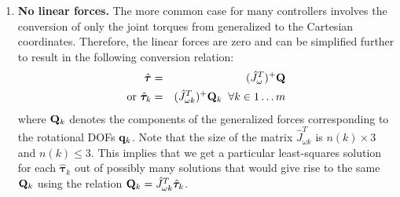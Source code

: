 \begin{enumerate}
\item \textbf{No linear forces. } The more common case for many controllers involves the conversion of only the joint torques from generalized to the Cartesian coordinates. Therefore, the linear forces  are zero and  can be simplified further to result in the following conversion relation:
\begin{eqnarray}
\nonumber
\hat{\bm{\tau}}  & = & (\hat{J}_{\omega}^T)^+ \mathbf{Q}\\
\mbox{or } \hat{\bm{\tau}}_k  & = & (\hat{J}_{\omega k}^T)^+ \mathbf{Q}_k \;\; \forall k \in 1\hdots m
\end{eqnarray}
where $\mathbf{Q}_k$ denotes the components of the generalized forces corresponding to the rotational DOFs $\mathbf{q}_k$. Note that the size of the matrix $\hat{J}_{\omega k}^T$ is $n(k)\times 3$ and $n(k)\leq 3$. This implies that we get a particular least-squares solution for each $\hat{\bm{\tau}}_k$ out of possibly many solutions that would give rise to the same $\mathbf{Q}_k$ using the relation $\mathbf{Q}_k = \hat{J}_{\omega k}^T \hat{\bm{\tau}}_k$.

\end{enumerate}

